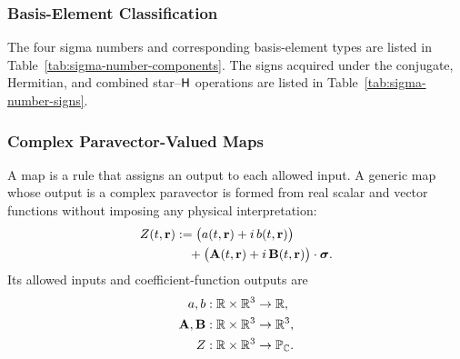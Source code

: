 \subsubsection{Basis-Element Classification}
The four sigma numbers and corresponding basis-element types are listed in
Table~\ref{tab:sigma-number-components}. The signs acquired under the
conjugate, Hermitian, and combined star--\(\mathsf H\) operations are listed in
Table~\ref{tab:sigma-number-signs}.

\subsubsection{Complex Paravector-Valued Maps}
A map is a rule that assigns an output to each allowed input. A generic map
whose output is a complex paravector is formed from real scalar and vector
functions without imposing any physical interpretation:
\begin{equation}
\begin{aligned}
Z(t,\mathbf{r}) &:= \bigl(a(t,\mathbf{r})+i\,b(t,\mathbf{r})\bigr)\\
&\quad + \bigl(\mathbf{A}(t,\mathbf{r})+i\,\mathbf{B}(t,\mathbf{r})\bigr)\cdot\mathbf{\bm{\sigma}}.
\end{aligned}
\label{eq:complex-paravector-map}
\end{equation}
Its allowed inputs and coefficient-function outputs are
\begin{align*}
a,b &: \mathbb{R}\times\mathbb{R}^3 \to \mathbb{R},\\
\mathbf{A},\mathbf{B} &: \mathbb{R}\times\mathbb{R}^3 \to \mathbb{R}^3,\\
Z &: \mathbb{R}\times\mathbb{R}^3 \to \mathbb{P}_{\mathbb{C}}.
\end{align*}
